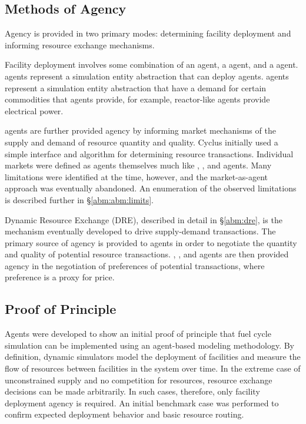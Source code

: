 \subsection{Methods of Agency}\label{abm:abm:agent}

Agency is provided in two primary modes: determining facility deployment and
informing resource exchange mechanisms. 

Facility deployment involves some combination of an  agent, a
 agent, and a  agent.  agents
represent a simulation entity abstraction that can deploy 
agents.  agents represent a simulation entity abstraction that have
a demand for certain commodities that  agents provide, for
example, reactor-like  agents provide electrical power.

 agents are further provided agency by informing market
mechanisms of the supply and demand of resource quantity and quality. Cyclus
initially used a simple interface and algorithm for determining resource
transactions. Individual markets were defined as agents themselves much like
, , and  agents. Many limitations
were identified at the time, however, and the market-as-agent approach was
eventually abandoned. An enumeration of the observed limitations is described
further in \S \ref{abm:abm:limits}.

Dynamic Resource Exchange (DRE), described in detail in \S \ref{abm:dre}, is the
mechanism eventually developed to drive supply-demand transactions. The primary
source of agency is provided to  agents in order to negotiate the
quantity and quality of potential resource transactions. ,
, and  agents are then provided agency in the
negotiation of preferences of potential transactions, where preference is a
proxy for price.

\subsection{Proof of Principle}\label{abm:abm:proof}

Agents were developed to show an initial proof of principle that fuel cycle
simulation can be implemented using an agent-based modeling methodology. By
definition, dynamic simulators model the deployment of facilities and measure
the flow of resources between facilities in the system over time. In the extreme
case of unconstrained supply and no competition for resources, resource exchange
decisions can be made arbitrarily. In such cases, therefore, only facility
deployment agency is required. An initial benchmark case was performed to
confirm expected deployment behavior and basic resource routing.

